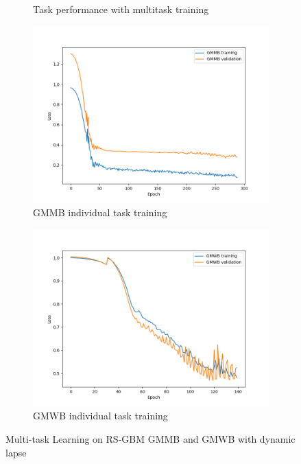 \begin{figure}[ht!]
\begin{subfigure}{0.48\textwidth}
        \caption{Task performance with multitask training}
        \label{subfig3-5:fineTuning}
    \end{subfigure}
    \begin{subfigure}{0.48\textwidth}
        \includegraphics[width=\textwidth]{./project3/figures/figure5c.png}
        \caption{GMMB individual task training} 
    \label{subfig3-5:gmmb_individual}
    \end{subfigure}\hfill
    \begin{subfigure}{0.48\textwidth}
        \includegraphics[width=\textwidth]{./project3/figures/figure5d.png}
        \caption{GMWB individual task training}
        \label{subfig3-5:gmwb_individual}
    \end{subfigure}
    \caption{Multi-task Learning on RS-GBM GMMB and GMWB with dynamic lapse}
    \label{fig3:figure5}
\end{figure}

